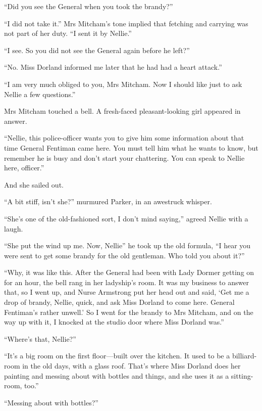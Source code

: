 \enquote{Did you see the General when you took the brandy?}

\enquote{I did not take it.} Mrs Mitcham's tone implied that fetching and carrying was not part of her duty. \enquote{I sent it by Nellie.}

\enquote{I see. So you did not see the General again before he left?}

\enquote{No. Miss Dorland informed me later that he had had a heart attack.}

\enquote{I am very much obliged to you, Mrs Mitcham. Now I should like just to ask Nellie a few questions.}

Mrs Mitcham touched a bell. A fresh-faced pleasant-looking girl appeared in answer.

\enquote{Nellie, this police-officer wants you to give him some information about that time General Fentiman came here. You must tell him what he wants to know, but remember he is busy and don't start your chattering. You can speak to Nellie here, officer.}

And she sailed out.

\enquote{A bit stiff, isn't she?} murmured Parker, in an awestruck whisper.

\enquote{She's one of the old-fashioned sort, I don't mind saying,} agreed Nellie with a laugh.

\enquote{She put the wind up me. Now, Nellie\longdash} he took up the old formula, \enquote{I hear you were sent to get some brandy for the old gentleman. Who told you about it?}

\enquote{Why, it was like this. After the General had been with Lady Dormer getting on for an hour, the bell rang in her ladyship's room. It was my business to answer that, so I went up, and Nurse Armstrong put her head out and said, \enquote{Get me a drop of brandy, Nellie, quick, and ask Miss Dorland to come here. General Fentiman's rather unwell.} So I went for the brandy to Mrs Mitcham, and on the way up with it, I knocked at the studio door where Miss Dorland was.}

\enquote{Where's that, Nellie?}

\enquote{It's a big room on the first floor\allowbreak---\allowbreak built over the kitchen. It used to be a billiard-room in the old days, with a glass roof. That's where Miss Dorland does her painting and messing about with bottles and things, and she uses it as a sitting-room, too.}

\enquote{Messing about with bottles?}


